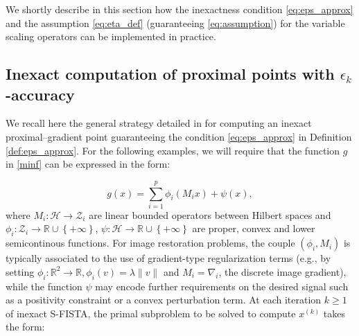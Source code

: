 \documentclass[conference]{IEEEtran}
\begin{document}
We shortly describe in this section how the inexactness condition \ref{eq:eps_approx} and the assumption \eqref{eq:eta_def} (guaranteeing \eqref{eq:assumption}) for the variable scaling operators can be implemented in practice.

\subsection{Inexact computation of proximal points with $\epsilon_k$-accuracy}  \label{sec:inexact}


We recall here the general strategy detailed in \cite[Section 4.2]{Bonettini2018a} for computing an inexact proximal--gradient point guaranteeing the condition \eqref{eq:eps_approx} in Definition \ref{def:eps_approx}. For the following examples, we will require that the  function $g$ in \eqref{minf} can be expressed in the form:

\begin{equation}  \label{eq:g_form}
g(x) = \sum_{i=1}^p \phi_i (M_ix) + \psi(x),
\end{equation}
where $M_i:\mathcal{H}\to \mathcal{Z}_i$ are linear bounded operators between Hilbert spaces and $\phi_i:\mathcal{Z}_i\to \mathbb{R}\cup\left\{+\infty\right\}$, $\psi:\mathcal{H}\to \mathbb{R}\cup\left\{+\infty\right\}$ are proper,  convex and lower semicontinous functions.
For image restoration problems, the couple $(\phi_i, M_i)$ is typically associated to the use of gradient-type regularization terms (e.g., by setting $\phi_i:\mathbb{R}^2\to\mathbb{R}, \phi_i(v) = \lambda\|v\|$ and $M_i = \nabla_i$, the discrete image gradient), while the function $\psi$ may encode further requirements on the desired signal such as a positivity constraint or a convex perturbation term.
At each iteration $k\geq 1$ of inexact S-FISTA, the primal subproblem to be solved to compute $x^{(k)}$ takes the form:
\end{document}

